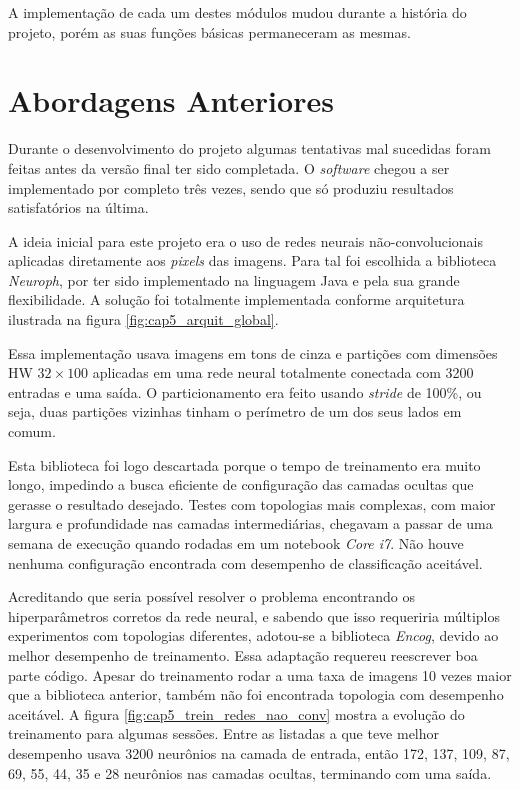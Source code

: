 A implementação de cada um destes módulos mudou durante a história do projeto,
porém as suas funções básicas permaneceram as mesmas.

\section{Abordagens Anteriores} \label{sec:cap5_abord_ant}
Durante o desenvolvimento do projeto algumas tentativas mal sucedidas foram
feitas antes da versão final ter sido completada. O \emph{software} chegou a
ser implementado por completo três vezes, sendo que só produziu resultados
satisfatórios na última.

A ideia inicial para este projeto era o uso de redes neurais não-convolucionais
aplicadas diretamente aos \emph{pixels} das imagens. Para tal foi escolhida a
biblioteca \emph{Neuroph}, por ter sido implementado na linguagem Java e pela
sua grande flexibilidade. A
solução foi totalmente implementada conforme arquitetura ilustrada na figura
\ref{fig:cap5_arquit_global}.

Essa implementação usava imagens em tons de cinza e partições com dimensões HW
$32 \times 100$ aplicadas em uma rede neural totalmente conectada com 3200
entradas e uma saída. O particionamento era feito usando \emph{stride} de
100\%, ou seja, duas partições vizinhas tinham o perímetro de um dos seus
lados em comum.

Esta biblioteca foi logo descartada porque o tempo de treinamento era muito
longo, impedindo a busca eficiente de configuração das camadas ocultas que
gerasse o resultado desejado. Testes com topologias mais complexas, com maior
largura e profundidade nas camadas intermediárias, chegavam a passar de uma
semana de execução quando rodadas em um notebook \emph{Core i7}. Não houve
nenhuma configuração encontrada com desempenho de classificação aceitável.

Acreditando que seria possível resolver o problema encontrando os
hiperparâmetros corretos da rede neural, e sabendo que isso requeriria
múltiplos experimentos com topologias diferentes, adotou-se a biblioteca
\emph{Encog},
devido ao melhor desempenho de treinamento. Essa adaptação requereu reescrever
boa parte código. Apesar do treinamento rodar a uma taxa de imagens 10
vezes maior que a biblioteca anterior, também não foi encontrada topologia
com desempenho aceitável. A figura
\ref{fig:cap5_trein_redes_nao_conv} mostra a
evolução do treinamento para algumas sessões. Entre as listadas a que teve
melhor desempenho usava 3200 neurônios na camada de entrada, então 172, 137,
109, 87, 69, 55, 44, 35 e 28 neurônios nas camadas ocultas, terminando
com uma saída.

